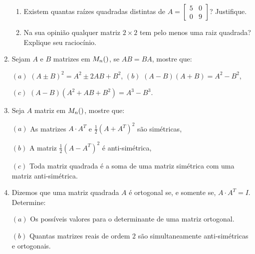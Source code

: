 \documentclass{report}
\begin{document}
\begin{Exercise}
\begin{enumerate}
\begin{enumerate}
\item  Existem quantas raízes quadradas distintas de $A=\left[
\begin{array}{cc}
5 & 0 \\
0 & 9
\end{array}
\right] $? Justifique.

\item  Na sua opinião qualquer matriz $2\times 2$ tem pelo menos
uma raiz quadrada? Explique seu raciocínio.
\end{enumerate}


\item \label{1lista12} Sejam $A$ e $B$ matrizes em $M_n(\real)$,
se $AB=BA$, mostre que:

$(a)$ $(A\pm B)^2 = A^2 \pm 2AB+B^2$, \hspace{2cm} $(b)$
$(A-B)(A+B) = A^2 - B^2$,

$(c)$ $(A-B)(A^2 +AB+B^2) = A^3 - B^3$.


\item \label{1lista13} Seja $A$ matriz em $M_n(\real)$, mostre
que:

$(a)$ As matrizes $A\cdot A^T$ e $\frac{1}{2}(A+A^T)^2$ são
simétricas,

$(b)$ A matriz $\frac{1}{2}(A-A^T)^2$ é anti-simétrica,

$(c)$ Toda matriz quadrada é a soma de uma matriz simétrica com
uma matriz anti-simétrica.


\item \label{1lista14} Dizemos que uma matriz quadrada $A$ é
ortogonal se, e somente se, $A\cdot A^T = I$. Determine:

$(a)$ Os possíveis valores para o determinante de uma matriz
ortogonal.

$(b)$ Quantas matrizes reais de ordem $2$ são simultaneamente
anti-simétricas e ortogonais.



\end{enumerate}
\end{Exercise}
\end{document}
